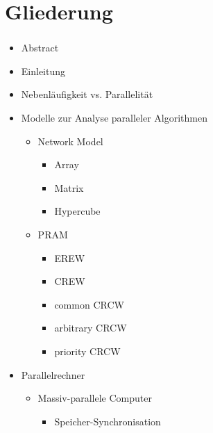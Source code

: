 
\section{Gliederung}
\label{sec:gliederung}

\begin{frame}[allowframebreaks]
    \frametitle{\insertsection}
    \begin{itemize}
        \item Abstract
        \item Einleitung
        \item Nebenläufigkeit vs. Parallelität
        \item Modelle zur Analyse paralleler Algorithmen
            \begin{itemize}
                \item Network Model
                    \begin{itemize}
                        \item Array
                        \item Matrix
                        \item Hypercube
                    \end{itemize}
                \item PRAM
                    \begin{itemize}
                        \item EREW
                        \item CREW
                        \item common CRCW
                        \item arbitrary CRCW
                        \item priority CRCW
                    \end{itemize}
            \end{itemize}
        \framebreak
        \item Parallelrechner
            \begin{itemize}
                \item Massiv-parallele Computer
                	\begin{itemize}
                		\item Speicher-Synchronisation
                	\end{itemize}

\end{itemize}
\end{itemize}
\end{frame}
